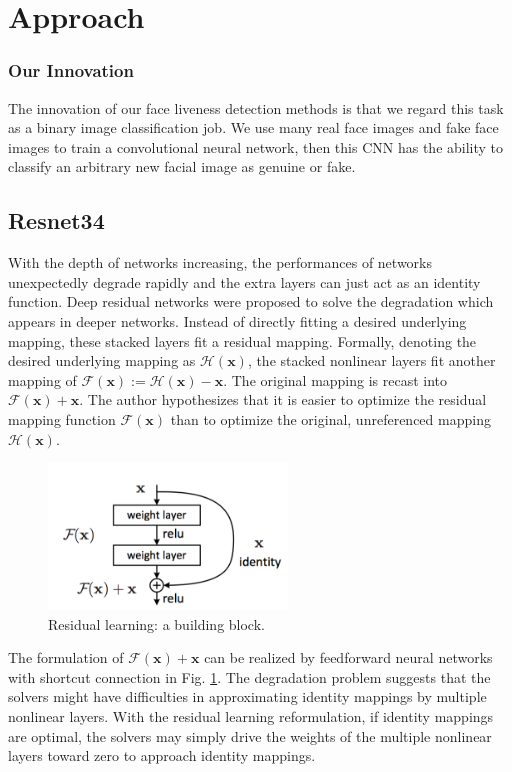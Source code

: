 \documentclass[journal]{IEEEtran}
\begin{document}
\section{Approach}


\subsubsection*{\textbf{Our Innovation}} The innovation of our face liveness detection methods is that we regard this task as a binary image classification job. We use many real face images and fake face images to train a convolutional neural network, then this CNN has the ability to classify an arbitrary new facial image as genuine or fake.

\subsection{Resnet34}
 With the depth of networks increasing, the performances of networks unexpectedly degrade rapidly and the extra layers can just act as an identity function. Deep residual networks were proposed to solve the degradation which appears in deeper networks\cite{he2016deep}\cite{he2016identity}. Instead of directly fitting a desired underlying mapping, these stacked layers fit a residual mapping. Formally, denoting the desired underlying mapping as $\mathcal{H}(\mathbf{x})$, the stacked nonlinear layers fit another mapping of $\mathcal{F}(\mathbf{x}) := \mathcal{H}(\mathbf{x})-\mathbf{x}$. The original mapping is recast into $\mathcal{F}(\mathbf{x}) + \mathbf{x}$. The author hypothesizes that it is easier to optimize the residual mapping function $\mathcal{F}(\mathbf{x})$ than to optimize the original, unreferenced mapping $\mathcal{H}(\mathbf{x})$. 

\begin{figure}[!t]
\centering
\includegraphics[width=2.5in]{img/Res_block}
\caption{Residual learning: a building block.}
\label{fig_2_1}
\end{figure}

The formulation of $\mathcal{F}(\mathbf{x})+\mathbf{x}$ can be realized by feedforward neural networks with shortcut connection in Fig. \ref{fig_2_1}. The degradation problem suggests that the solvers might have difficulties in approximating identity mappings by multiple nonlinear layers. With the residual learning reformulation, if identity mappings are optimal, the solvers may simply drive the weights of the multiple nonlinear layers toward zero to approach identity mappings.
\end{document}
